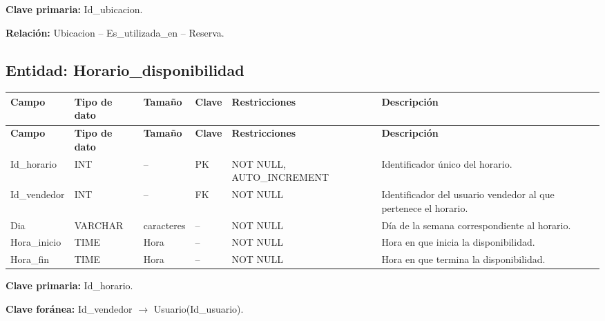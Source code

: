 \documentclass[12pt]{article} %
\begin{document}
\textbf{Clave primaria:} Id\_ubicacion.

\textbf{Relación:}
Ubicacion -- Es\_utilizada\_en -- Reserva.



\subsection{Entidad: Horario\_disponibilidad}

\begin{longtable}{>{\raggedright\arraybackslash}p{2.5cm}
                  >{\raggedright\arraybackslash}p{2.0cm}
                  >{\raggedright\arraybackslash}p{2.2cm}
                  >{\raggedright\arraybackslash}p{1.2cm}
                  >{\raggedright\arraybackslash}p{3.0cm}
                  >{\raggedright\arraybackslash}p{4.0cm}}
\toprule
\textbf{Campo} &
\textbf{Tipo de dato} &
\textbf{Tamaño} &
\textbf{Clave} &
\textbf{Restricciones} &
\textbf{Descripción} \\
\midrule
\endfirsthead

\toprule
\textbf{Campo} &
\textbf{Tipo de dato} &
\textbf{Tamaño} &
\textbf{Clave} &
\textbf{Restricciones} &
\textbf{Descripción} \\
\midrule
\endhead

Id\_horario &
INT &
-- &
PK &
NOT NULL, AUTO\_INCREMENT &
Identificador único del horario. \\

Id\_vendedor &
INT &
-- &
FK &
NOT NULL &
Identificador del usuario vendedor al que pertenece el horario. \\

Dia &
VARCHAR &
15 caracteres &
-- &
NOT NULL &
Día de la semana correspondiente al horario. \\

Hora\_inicio &
TIME &
Hora &
-- &
NOT NULL &
Hora en que inicia la disponibilidad. \\

Hora\_fin &
TIME &
Hora &
-- &
NOT NULL &
Hora en que termina la disponibilidad. \\

\bottomrule
\end{longtable}

\textbf{Clave primaria:} Id\_horario.

\textbf{Clave foránea:}
Id\_vendedor $\rightarrow$ Usuario(Id\_usuario).
\end{document}
